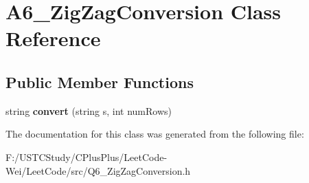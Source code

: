 \hypertarget{class_a6___zig_zag_conversion}{}\section{A6\+\_\+\+Zig\+Zag\+Conversion Class Reference}
\label{class_a6___zig_zag_conversion}
\subsection*{Public Member Functions}
\begin{DoxyCompactItemize}
\item 
\hypertarget{class_a6___zig_zag_conversion_a8855072331e751d24d709d7870239b41}{}\label{class_a6___zig_zag_conversion_a8855072331e751d24d709d7870239b41} 
string {\bfseries convert} (string s, int num\+Rows)
\end{DoxyCompactItemize}


The documentation for this class was generated from the following file\+:\begin{DoxyCompactItemize}
\item 
F\+:/\+U\+S\+T\+C\+Study/\+C\+Plus\+Plus/\+Leet\+Code-\/\+Wei/\+Leet\+Code/src/Q6\+\_\+\+Zig\+Zag\+Conversion.\+h\end{DoxyCompactItemize}
